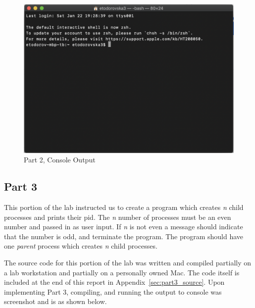         \begin{figure}[H]
            \centering
            \includegraphics[width=\linewidth]{figures/placeholder.png}
            \caption{Part 2, Console Output}
            \label{fig:part2_output}
        \end{figure}



    \newpage
    \subsection{Part 3}\label{subsec:part3}
        This portion of the lab instructed us to create a program which creates \emph{n} child processes and prints their pid.
        The \emph{n} number of processes must be an even number and passed in as user input.
        If \emph{n} is not even a message should indicate that the number is odd, and terminate the program.
        The program should have one \emph{parent} process which creates \emph{n} child processes.

        \medskip
        \noindent The source code for this portion of the lab was written and compiled partially on a lab workstation and partially on a personally owned Mac.
        The code itself is included at the end of this report in Appendix~\ref{sec:part3_source}.
        Upon implementing Part 3, compiling, and running the output to console was screenshot and is as shown below.


